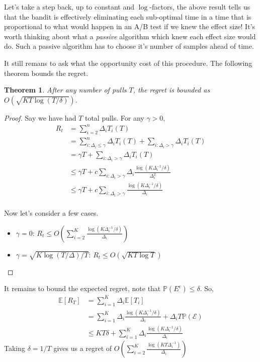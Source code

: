 \documentclass[11pt]{article}
\newtheorem{theorem}{Theorem}
\renewcommand{\P}{\mathbb{P}}
\newcommand{\E}{\mathbb{E}}
\newcommand{\mc}[1]{\mathcal{#1}}
\newcommand{\1}[1]{\mathbf{1}\left\{#1\right\}}
\begin{document}
Let's take a step back, up to constant and $\log$-factors, the above result tells us that the bandit is effectively eliminating each sub-optimal time in a time that is proportional to what would happen in an A/B test if we knew the effect size! It's worth thinking about what a \textit{passive} algorithm which knew each effect size would do. Such a passive algorithm has to choose it's number of samples ahead of time. 


It still remans to ask what the opportunity cost of this procedure. The following theorem bounds the regret. 

\begin{theorem}
    After any number of pulls $T$, the regret is bounded as $O(\sqrt{KT\log(T/\delta)})$.
\end{theorem}
\begin{proof}
    Say we have had $T$ total pulls. For any $\gamma >0$,
    \begin{align*}
        R_t 
        &= \sum_{i=2}^n \Delta_i T_i(T)\tag{$T_i(T)$ denotes the number of pulls up to time $T$}\\
        &= \sum_{i:\Delta_i \leq \gamma}^n \Delta_i T_i(T) +\sum_{i:\Delta_i > \gamma} \Delta_i T_i(T) \\
        &= \gamma T +\sum_{i:\Delta_i > \gamma} \Delta_i T_i(T) \\        
        &\leq \gamma T +c\sum_{i:\Delta_i > \gamma} \Delta_i\frac{\log(K\Delta_i^{-1}/\delta)}{\Delta_i^2} \\        
        &\leq \gamma T +c\sum_{i:\Delta_i > \gamma} \frac{\log(K\Delta_i^{-1}/\delta)}{\Delta_i} \\        
    \end{align*}

Now let's consider a few cases.
\begin{itemize}
    \item $\gamma = 0$: $R_t \leq O\left(\sum_{i=2}^K \frac{\log(K\Delta_i^{-1}/\delta)}{\Delta_i} \right)$
    \item $\gamma = \sqrt{K\log(T/\Delta)/T}$: $R_t \leq O\left(\sqrt{KT\log{T}}\right)$
\end{itemize}
\end{proof}

It remains to bound the expected regret, note that $\P(E^{c}) \leq \delta$. So,
\begin{align*}
    \E[R_T] 
    &= \sum_{i=1}^{K} \Delta_i \E[T_i] \\
    &= \sum_{i=1}^K\Delta_i \frac{\log(K\Delta_i^{-1}/\delta)}{\Delta_i} + \Delta_i T\P(\mc{E}) \\
    &\leq KT\delta + \sum_{i=1}^K\Delta_i \frac{\log(K\Delta_i^{-1}/\delta)}{\Delta_i} 
\end{align*}
Taking $\delta = 1/T$ gives us a regret of $O(\sum_{i=2}^K \frac{\log(K T\Delta_i^{-1})}{\Delta_i})$
\end{document}
